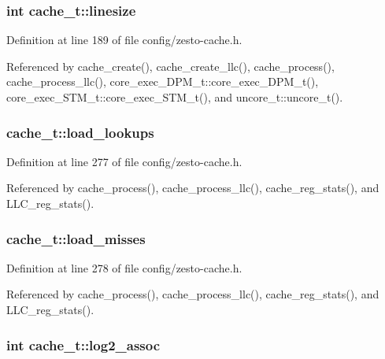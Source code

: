 \subsubsection[{linesize}]{\setlength{\rightskip}{0pt plus 5cm}int {\bf cache\_\-t::linesize}}\label{structcache__t_788c5a8fba04b7d38c39e3e94879d454}




Definition at line 189 of file config/zesto-cache.h.

Referenced by cache\_\-create(), cache\_\-create\_\-llc(), cache\_\-process(), cache\_\-process\_\-llc(), core\_\-exec\_\-DPM\_\-t::core\_\-exec\_\-DPM\_\-t(), core\_\-exec\_\-STM\_\-t::core\_\-exec\_\-STM\_\-t(), and uncore\_\-t::uncore\_\-t().
\subsubsection[{load\_\-lookups}]{ {\bf cache\_\-t::load\_\-lookups}}\label{structcache__t_7b4009ed01ea452bc5bcd55e8a1ab452}




Definition at line 277 of file config/zesto-cache.h.

Referenced by cache\_\-process(), cache\_\-process\_\-llc(), cache\_\-reg\_\-stats(), and LLC\_\-reg\_\-stats().
\subsubsection[{load\_\-misses}]{ {\bf cache\_\-t::load\_\-misses}}\label{structcache__t_74545f135a47d5413065fe4df131b67b}




Definition at line 278 of file config/zesto-cache.h.

Referenced by cache\_\-process(), cache\_\-process\_\-llc(), cache\_\-reg\_\-stats(), and LLC\_\-reg\_\-stats().
\subsubsection[{log2\_\-assoc}]{\setlength{\rightskip}{0pt plus 5cm}int {\bf cache\_\-t::log2\_\-assoc}}\label{structcache__t_e0265faa626c4ea6a7ed78619fced2a6}




